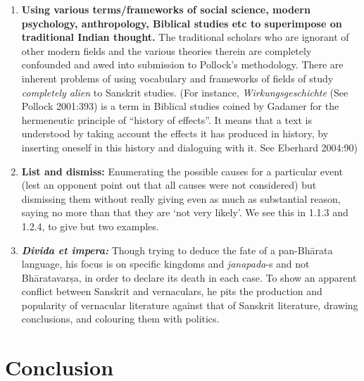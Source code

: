 \begin{enumerate}
\item {\bf Using various terms/frameworks of social science, modern psychology, anthropology, Biblical studies etc to superimpose on traditional Indian thought.} The traditional scholars who are ignorant of other modern fields and the various theories therein are completely confounded and awed into submission to Pollock's methodology. There are inherent problems of using vocabulary and frameworks of fields of study {\sl completely alien} to Sanskrit studies. (For instance, {\sl Wirkungsgeschichte} (See Pollock 2001:393) is a term in Biblical studies coined by Gadamer for the hermeneutic principle of “history of effects”. It means that a text is understood by taking account the effects it has produced in history, by inserting oneself in this history and dialoguing with it. See Eberhard 2004:90)
\item {\bf List and dismiss:} Enumerating the possible causes for a particular event (lest an opponent point out that all causes were not considered) but dismissing them without really giving even as much as substantial reason, saying no more than that they are ‘not very likely’. We see this in 1.1.3 and 1.2.4, to give but two examples. 
\item {\sl\bfseries Divida et impera:} Though trying to deduce the fate of a pan-Bhārata language, his focus is on specific kingdoms and {\sl janapada}-s and not Bhāratavarṣa, in order to declare its death in each case. To show an apparent conflict between Sanskrit and vernaculars, he pits the production and popularity of vernacular literature against that of Sanskrit literature, drawing conclusions, and colouring them with politics.
\end{enumerate}

\section{Conclusion}

